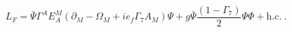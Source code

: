 \begin{equation}
L_F= \bar\Psi\Gamma^A E_A^M (\partial_M-\Omega_M+ i e_f\Gamma_7 A_M)\Psi+
g\bar\Psi\frac{(1-\Gamma_7)}{2}\Psi\Phi + \mbox{h.c.}~.
\end{equation}

